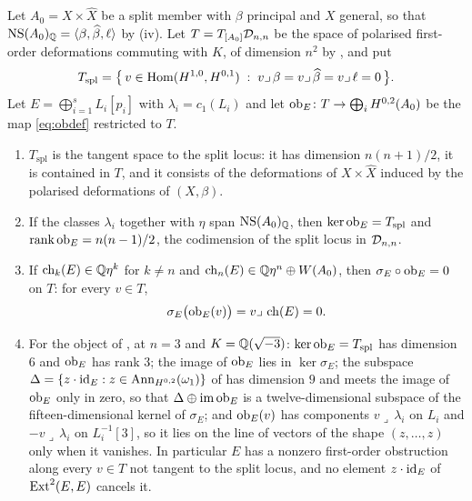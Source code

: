 \begin{proposition}
\label{prop:splitobstruction}
Let $A_{0}=X\times\widehat X$ be a split member with $\beta$ principal and
$X$ general, so that $\mathrm{NS}(A_{0})_{\mathbb{Q}}=\langle\beta,\widehat\beta,\ell\rangle$
by (iv). Let $T=T_{[A_{0}]}\mathcal{D}_{n,n}$ be the space of
polarised first-order deformations commuting with $K$, of dimension $n^{2}$
by , and put
\[
  T_{\mathrm{spl}}
  =\bigl\{\,v\in\operatorname{Hom}(H^{1,0},H^{0,1})\;:\;
    v\lrcorner\,\beta=v\lrcorner\,\widehat\beta=v\lrcorner\,\ell=0\,\bigr\}.
\]
Let $E=\bigoplus_{i=1}^{s}L_{i}[p_{i}]$ with $\lambda_{i}=c_{1}(L_{i})$ and
let $\operatorname{ob}_{E}\colon T\to\bigoplus_{i}H^{0,2}(A_{0})$ be the map
\eqref{eq:obdef} restricted to $T$.
\begin{enumerate}[label=\textup{(\roman*)},nosep]
\item $T_{\mathrm{spl}}$ is the tangent space to the split locus: it has
  dimension $n(n+1)/2$, it is contained in $T$, and it consists of the
  deformations of $X\times\widehat X$ induced by the polarised deformations
  of $(X,\beta)$.
\item If the classes $\lambda_{i}$ together with $\eta$ span
  $\mathrm{NS}(A_{0})_{\mathbb{Q}}$, then $\ker\operatorname{ob}_{E}=T_{\mathrm{spl}}$ and
  $\operatorname{rank}\operatorname{ob}_{E}=n(n-1)/2$, the codimension of the split locus
  in $\mathcal{D}_{n,n}$.
\item If $\operatorname{ch}_{k}(E)\in\mathbb{Q}\eta^{k}$ for $k\ne n$ and
  $\operatorname{ch}_{n}(E)\in\mathbb{Q}\eta^{n}\oplus W(A_{0})$, then
  $\sigma_{E}\circ\operatorname{ob}_{E}=0$ on $T$: for every $v\in T$,
  \begin{equation}\label{eq:sigmaob}
    \sigma_{E}\bigl(\operatorname{ob}_{E}(v)\bigr)=v\lrcorner\,\operatorname{ch}(E)=0 .
  \end{equation}
\item For the object of , at $n=3$ and
  $K=\mathbb{Q}(\sqrt{-3})$: $\ker\operatorname{ob}_{E}=T_{\mathrm{spl}}$ has dimension $6$ and
  $\operatorname{ob}_{E}$ has rank $3$; the image of $\operatorname{ob}_{E}$ lies in $\ker\sigma_{E}$;
  the subspace $\Delta=\{z\cdot\operatorname{id}_{E}:z\in\operatorname{Ann}_{H^{0,2}}(\omega_{1})\}$ of
   has dimension $9$ and meets the image of $\operatorname{ob}_{E}$
  only in zero, so that $\Delta\oplus\operatorname{im}\operatorname{ob}_{E}$ is a twelve-dimensional
  subspace of the fifteen-dimensional kernel of $\sigma_{E}$; and
  $\operatorname{ob}_{E}(v)$ has components $v\lrcorner\,\lambda_{i}$ on $L_{i}$ and
  $-v\lrcorner\,\lambda_{i}$ on $L_{i}^{-1}[3]$, so it lies on the line of
  vectors of the shape $(z,\dots,z)$ only when it vanishes. In particular
  $E$ has a nonzero first-order obstruction along every $v\in T$ not tangent
  to the split locus, and no element $z\cdot\operatorname{id}_{E}$ of $\operatorname{Ext}^{2}(E,E)$
  cancels it.
\end{enumerate}
\end{proposition}

